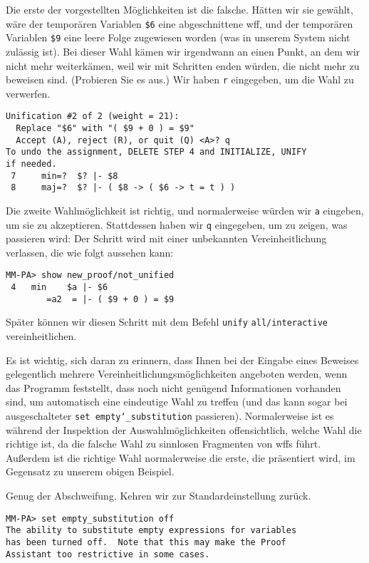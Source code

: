 Die erste der vorgestellten Möglichkeiten ist die falsche.  Hätten wir sie gewählt, wäre der temporären Variablen \texttt{\$6} eine abgeschnittene wff, und der temporären Variablen \texttt{\$9} eine leere Folge zugewiesen worden (was in unserem System nicht zulässig ist).  Bei dieser Wahl kämen wir irgendwann an einen Punkt, an dem wir nicht mehr weiterkämen, weil wir mit Schritten enden würden, die nicht mehr zu beweisen sind.  (Probieren Sie es aus.) Wir haben \texttt{r} eingegeben, um die Wahl zu verwerfen.

\begin{verbatim}
Unification #2 of 2 (weight = 21):
  Replace "$6" with "( $9 + 0 ) = $9"
  Accept (A), reject (R), or quit (Q) <A>? q
To undo the assignment, DELETE STEP 4 and INITIALIZE, UNIFY
if needed.
 7     min=?  $? |- $8
 8     maj=?  $? |- ( $8 -> ( $6 -> t = t ) )
\end{verbatim}

Die zweite Wahlmöglichkeit ist richtig, und normalerweise würden wir \texttt{a} eingeben, um sie zu akzeptieren.  Stattdessen haben wir \texttt{q} eingegeben, um zu zeigen, was passieren wird: Der Schritt wird mit einer unbekannten Vereinheitlichung verlassen, die wie folgt aussehen kann:

\begin{verbatim}
MM-PA> show new_proof/not_unified
 4   min    $a |- $6
        =a2  = |- ( $9 + 0 ) = $9
\end{verbatim}

Später können wir diesen Schritt mit dem Befehl \texttt{unify} \texttt{all/interactive} vereinheitlichen.

Es ist wichtig, sich daran zu erinnern, dass Ihnen bei der Eingabe eines Beweises gelegentlich mehrere Vereinheitlichungsmöglichkeiten angeboten werden, wenn das Programm feststellt, dass noch nicht genügend Informationen vorhanden sind, um automatisch eine eindeutige Wahl zu treffen (und das kann sogar bei ausgeschalteter \texttt{set empty{\char`\_}substitution} passieren).  Normalerweise ist es während der Inspektion der Auswahlmöglichkeiten offensichtlich, welche Wahl die richtige ist, da die falsche Wahl zu sinnlosen Fragmenten von wffs führt.  Außerdem ist die richtige Wahl normalerweise die erste, die präsentiert wird, im Gegensatz zu unserem obigen Beispiel.

Genug der Abschweifung.  Kehren wir zur Standardeinstellung zurück.

\begin{verbatim}
MM-PA> set empty_substitution off
The ability to substitute empty expressions for variables
has been turned off.  Note that this may make the Proof
Assistant too restrictive in some cases.
\end{verbatim}

